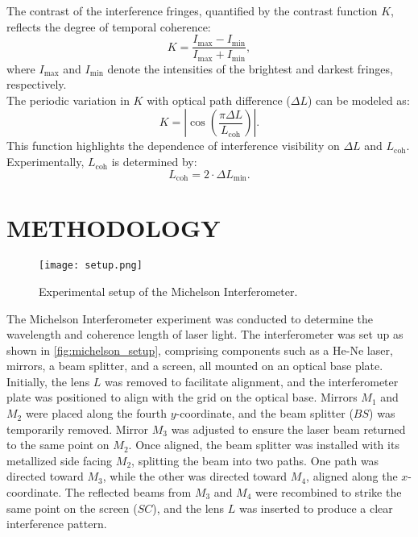 \documentclass[a4paper,11pt]{article}
\begin{document}
The contrast of the interference fringes, quantified by the contrast function \(K\), reflects the degree of temporal coherence:
\[
K = \frac{I_{\text{max}} - I_{\text{min}}}{I_{\text{max}} + I_{\text{min}}},
\]
where \(I_{\text{max}}\) and \(I_{\text{min}}\) denote the intensities of the brightest and darkest fringes, respectively.\\

The periodic variation in \(K\) with optical path difference (\(\Delta L\)) can be modeled as:
\[
K = \left| \cos\left( \frac{\pi \Delta L}{L_{\text{coh}}} \right) \right|.
\]
This function highlights the dependence of interference visibility on \(\Delta L\) and \(L_{\text{coh}}\).\\

Experimentally, \(L_{\text{coh}}\) is determined by:
\[
L_{\text{coh}} = 2 \cdot \Delta L_{\text{min}}.
\]


\newpage
\section{\centering METHODOLOGY}
\label{sec:METHODOLOGY}

\indent

\begin{figure}[h!]
  \centering
  \texttt{[image: setup.png]} %
  \caption{Experimental setup of the Michelson Interferometer.\autocite{usm_2os3_manual}}
  \label{fig:michelson_setup}
\end{figure}

The Michelson Interferometer experiment \autocite{usm_2os3_manual} was conducted to determine the wavelength and coherence length of laser light. The interferometer was set up as shown in \autoref{fig:michelson_setup}, comprising components such as a He-Ne laser, mirrors, a beam splitter, and a screen, all mounted on an optical base plate. Initially, the lens \(L\) was removed to facilitate alignment, and the interferometer plate was positioned to align with the grid on the optical base. Mirrors \(M_1\) and \(M_2\) were placed along the fourth \(y\)-coordinate, and the beam splitter (\(BS\)) was temporarily removed. Mirror \(M_3\) was adjusted to ensure the laser beam returned to the same point on \(M_2\). Once aligned, the beam splitter was installed with its metallized side facing \(M_2\), splitting the beam into two paths. One path was directed toward \(M_3\), while the other was directed toward \(M_4\), aligned along the \(x\)-coordinate. The reflected beams from \(M_3\) and \(M_4\) were recombined to strike the same point on the screen (\(SC\)), and the lens \(L\) was inserted to produce a clear interference pattern.\\
\end{document}

